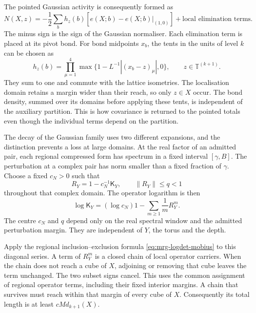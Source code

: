\documentclass[11pt,letterpaper,reqno]{amsart}
\theoremstyle{definition}
\theoremstyle{remark}
\begin{document}
The pointed Gaussian activity is consequently formed as
\[
 N(X,z)=-\frac12\sum_bh_z(b)
           [e(X;b)-e(X;b)|_{(1,0)}]
       +\text{local elimination terms}.
\]
The minus sign is the sign of the Gaussian normaliser.
Each elimination term is placed at its pivot bond. For
bond midpoints $x_b$, the tents in the units of level $k$
can be chosen as
\[
 h_z(b)=\prod_{\mu=1}^4
       \max\{1-L^{-1}|(x_b-z)_\mu|,0\},
       \qquad z\in\mathbb T^{(k+1)}.
\]
They sum to one and commute with the lattice isometries.
The localisation domain retains a margin wider than their
reach, so only $z\in X$ occur. The bond density, summed
over its domains before applying these tents, is independent
of the auxiliary partition. This is how covariance is
returned to the pointed totals even though the individual
terms depend on the partition.

The decay of the Gaussian family uses two different expansions,
and the distinction prevents a loss at large domains. At the
real factor of an admitted pair, each regional compressed form
has spectrum in a fixed interval $[\gamma,B]$. The perturbation
at a complex pair has norm smaller than a fixed fraction of
$\gamma$. Choose a fixed $c_N>0$ such that
\[
 R_Y=1-c_N^{-1}\mathsf K_Y,
                  \qquad \|R_Y\|\le q<1
\]
throughout that complex domain. The operator logarithm is then
\[
 \log\mathsf K_Y=(\log c_N)1
                         -\sum_{m\ge1}\frac1mR_Y^m.
\]
The centre $c_N$ and $q$ depend only on the real spectral
window and the admitted perturbation margin. They are
independent of $Y$, the torus and the depth.

Apply the regional inclusion--exclusion formula
\eqref{eq:mrg-logdet-mobius} to this diagonal series. A term
of $R_Y^m$ is a closed chain of local operator carriers. When
the chain does not reach a cube of $X$, adjoining or removing
that cube leaves the term unchanged. The two subset signs
cancel. This uses the common assignment of regional operator
terms, including their fixed interior margins. A chain that
survives must reach within that margin of every cube of $X$.
Consequently its total length is at least $cMd_{k+1}(X)$.
\end{document}
